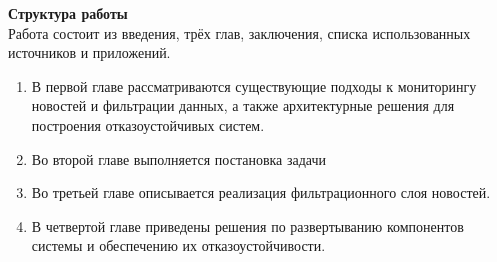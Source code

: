\textbf{Структура работы}\\
Работа состоит из введения, трёх глав, заключения, списка использованных источников и приложений.
\begin{enumerate}
    \item В первой главе рассматриваются существующие подходы к мониторингу новостей и фильтрации данных, а также архитектурные решения для построения отказоустойчивых систем.
    \item Во второй главе выполняется постановка задачи
    \item Во третьей главе описывается реализация фильтрационного слоя новостей.
    \item В четвертой главе приведены решения по развертыванию компонентов системы и обеспечению их отказоустойчивости.
\end{enumerate}
